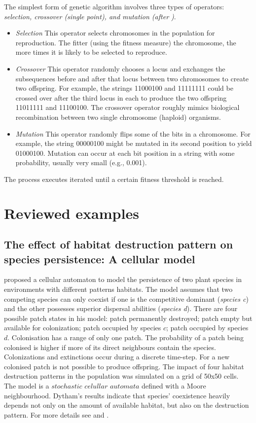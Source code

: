 \documentclass[fleqn,10pt]{SelfArx} %
\begin{document}
The simplest form of genetic algorithm involves three types of operators: {\em selection, crossover (single point), and mutation (after \citep{mitchell_ga})}. 
\begin{itemize}
\item {\em Selection} This operator selects chromosomes in the population for reproduction. The fitter (using the fitness measure) the chromosome, the more times it is likely to be selected to reproduce.
\item {\em Crossover} This operator randomly chooses a locus and exchanges the subsequences before and after that locus between two chromosomes to create two offspring. For example, the strings 11000100 and 11111111 could be crossed over after the third locus in each to produce the two offspring 11011111 and 11100100. The crossover operator roughly mimics biological recombination between two single chromosome (haploid) organisms.
\item {\em Mutation} This operator randomly flips some of the bits in a chromosome. For example, the string 00000100 might be mutated in its second position to yield 01000100. Mutation can occur at each bit position in a string with some probability, usually very small (e.g., 0.001).
\end{itemize}
The process executes iterated until a certain fitness threshold is reached.

\section{Reviewed examples}
\subsection{The effect of habitat destruction pattern on species persistence: A cellular model}
\citet{dytham1995} proposed a cellular automaton to model the persistence of two plant species in environments with different patterns habitats. The model assumes that two competing species can only coexist if one is the competitive dominant ({\em species c}) and the other possesses superior dispersal abilities ({\em species d}). There are four possible patch states in his model: patch permanently destroyed; patch empty but available for colonization; patch occupied by species $c$; patch occupied by species $d$. Colonisation has a range of only one patch. The probability of a patch being colonised is higher if more of its direct neighbours contain the species.
Colonizations and extinctions occur during a discrete time-step. For a new colonised patch is not possible to produce offspring. The impact of four habitat destruction patterns in the population was simulated on a grid of 50x50 cells. The model is a $stochastic$ $celullar$ $automata$ defined with a Moore neighbourhood.
Dytham’s results indicate that species’ coexistence heavily depends not only on the amount of available habitat, but also on the destruction pattern. For more details see \citep{Balzter1998} and \citep{dytham1995}.
\end{document}
